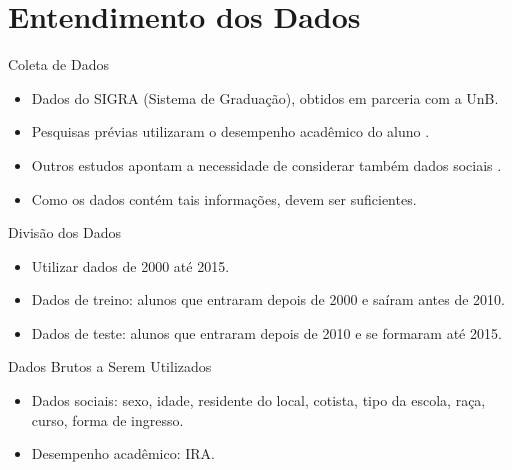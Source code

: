 \section{Entendimento dos Dados}

\begin{frame}{Coleta de Dados}
    \begin{itemize}[itemsep=3ex]
        \item Dados do SIGRA (Sistema de Graduação), obtidos em parceria com a UnB.
        \item Pesquisas prévias utilizaram o desempenho acadêmico do aluno
            \cite{adeodato}.
        \item Outros estudos apontam a necessidade de considerar também dados sociais
            \cite{predict_retention}.
        \item Como os dados contém tais informações, devem ser suficientes.
    \end{itemize}
\end{frame}

\begin{frame}{Divisão dos Dados}
    \begin{itemize}[itemsep=3ex]
        \item Utilizar dados de 2000 até 2015. 
        \item Dados de treino: alunos que entraram depois de 2000 e saíram antes de
            2010.
        \item Dados de teste: alunos que entraram depois de 2010 e se formaram até
            2015.
    \end{itemize}
\end{frame}

\begin{frame}{Dados Brutos a Serem Utilizados}
    \begin{itemize}[itemsep=3ex]
        \item Dados sociais: sexo, idade, residente do local, cotista,
            tipo da escola, raça, curso, forma de ingresso.
        \item Desempenho acadêmico: IRA.
    \end{itemize}
\end{frame}

